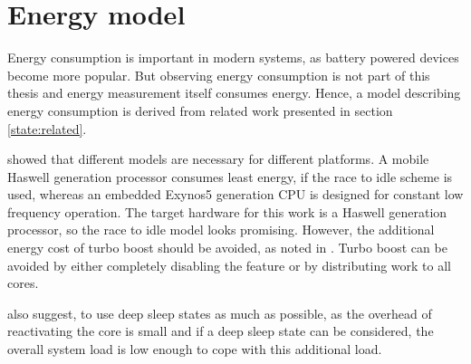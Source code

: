 \section{Energy model}
\label{design:energy}

Energy consumption is important in modern systems, as battery powered devices
become more popular.
But observing energy consumption is not part of this thesis and energy
measurement itself consumes energy.
Hence, a model describing energy consumption is derived from related work
presented in section \ref{state:related}.

\cite{imes_poet_2015} showed that different models are necessary for different
platforms.
A mobile Haswell generation processor consumes least energy, if the race to
idle scheme is used, whereas an embedded Exynos5 generation CPU is designed for
constant low frequency operation.
The target hardware for this work is a Haswell generation processor, so the
race to idle model looks promising.
However, the additional energy cost of turbo boost should be avoided, as noted
in \cite{le_sueur_slow_2011}.
Turbo boost can be avoided by either completely disabling the feature or by
distributing work to all cores.

\cite{le_sueur_slow_2011} also suggest, to use deep sleep states as much as
possible, as the overhead of reactivating the core is small and if a deep sleep
state can be considered, the overall system load is low enough to cope with
this additional load.
%
